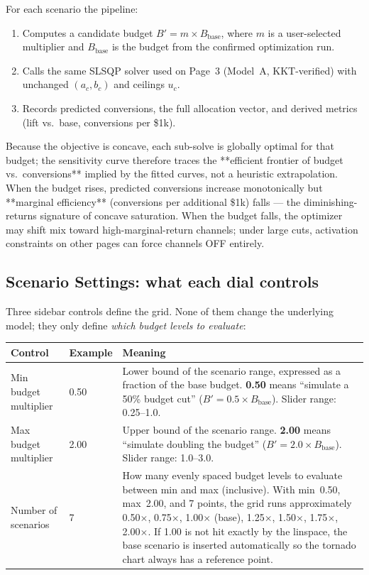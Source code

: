 \documentclass[11pt]{article}
\begin{document}
For each scenario the pipeline:
\begin{enumerate}[nosep]
  \item Computes a candidate budget $B' = m \times B_{\text{base}}$, where $m$ is a user-selected multiplier and $B_{\text{base}}$ is the budget from the confirmed optimization run.
  \item Calls the same SLSQP solver used on Page~3 (Model~A, KKT-verified) with unchanged $(a_c, b_c)$ and ceilings $u_c$.
  \item Records predicted conversions, the full allocation vector, and derived metrics (lift vs.\ base, conversions per \$1k).
\end{enumerate}

Because the objective is concave, each sub-solve is globally optimal for that budget; the sensitivity curve therefore traces the **efficient frontier of budget vs.\ conversions** implied by the fitted curves, not a heuristic extrapolation. When the budget rises, predicted conversions increase monotonically but **marginal efficiency** (conversions per additional \$1k) falls --- the diminishing-returns signature of concave saturation. When the budget falls, the optimizer may shift mix toward high-marginal-return channels; under large cuts, activation constraints on other pages can force channels OFF entirely.

\subsection{Scenario Settings: what each dial controls}

Three sidebar controls define the grid. None of them change the underlying model; they only define \emph{which budget levels to evaluate}:

\begin{center}
\begin{tabular}{p{3.2cm}p{2.2cm}p{8.5cm}}
\toprule
\textbf{Control} & \textbf{Example} & \textbf{Meaning} \\
\midrule
Min budget multiplier & 0.50 & Lower bound of the scenario range, expressed as a fraction of the base budget. \textbf{0.50} means ``simulate a 50\% budget cut'' ($B' = 0.5 \times B_{\text{base}}$). Slider range: 0.25--1.0. \\
Max budget multiplier & 2.00 & Upper bound of the scenario range. \textbf{2.00} means ``simulate doubling the budget'' ($B' = 2.0 \times B_{\text{base}}$). Slider range: 1.0--3.0. \\
Number of scenarios & 7 & How many evenly spaced budget levels to evaluate between min and max (inclusive). With min~0.50, max~2.00, and 7 points, the grid runs approximately 0.50$\times$, 0.75$\times$, 1.00$\times$ (base), 1.25$\times$, 1.50$\times$, 1.75$\times$, 2.00$\times$. If 1.00 is not hit exactly by the linspace, the base scenario is inserted automatically so the tornado chart always has a reference point. \\
\bottomrule
\end{tabular}
\end{center}
\end{document}
